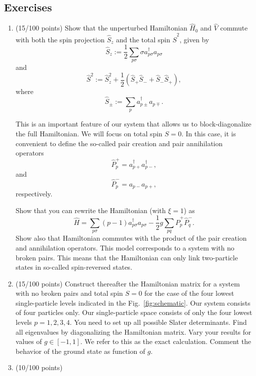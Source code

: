 \documentclass[prc]{revtex4} \usepackage[dvips]{graphicx}
\begin{document}
\subsection*{Exercises}

\begin{enumerate}
\item (15/100 points) Show that the unperturbed Hamiltonian $\hat{H}_0$ and $\hat{V}$
  commute with both the spin projection $\hat{S}_z$ and the total spin
  $\hat{S}^2$, given by
\[
  \hat{S}_z := \frac{1}{2}\sum_{p\sigma} \sigma
  a^\dag_{p\sigma}a_{p\sigma}
\]
and
\[
  \hat{S}^2 := \hat{S}_z^2 + \frac{1}{2}(\hat{S}_+\hat{S}_- +
  \hat{S}_-\hat{S}_+),
\]
where
\[
  \hat{S}_\pm := \sum_{p} a^\dag_{p\pm} a_{p\mp}.
\]

This is an important feature of our system that allows us to
block-diagonalize the full Hamiltonian. We will focus on total spin
$S=0$.  In this case, it is convenient to define the so-called pair
creation and pair annihilation operators
\[
\hat{P}^{+}_p = a^\dag_{p+}a^\dag_{p-},
\]
and
\[
\hat{P}^{-}_p = a_{p-}a_{p+},
\] 
respectively.

Show that you can rewrite the Hamiltonian (with $\xi=1$) as
\[
\hat{H}=\sum_{p\sigma}(p-1)a_{p\sigma}^{\dagger}a_{p\sigma}
-\frac{1}{2}g\sum_{pq}\hat{P}^{+}_p\hat{P}^{-}_q.
\]
Show also that Hamiltonian commutes with the product of the pair
creation and annihilation operators.  This model corresponds to a
system with no broken pairs. This means that the Hamiltonian can only
link two-particle states in so-called spin-reversed states.


\item (15/100 points) Construct thereafter the Hamiltonian matrix for a system with no
  broken pairs and total spin $S=0$ for the case of the four lowest
  single-particle levels indicated in the
  Fig.~\ref{fig:schematic}. Our system consists of four particles
  only.  Our single-particle space consists of only the four lowest
  levels $p=1,2,3,4$.  You need to set up all possible Slater
  determinants.  Find all eigenvalues by diagonalizing the Hamiltonian
  matrix.  Vary your results for values of $g\in [-1,1]$.  We refer to
  this as the exact calculation. Comment the behavior of the ground
  state as function of $g$.

\item  (10/100 points)


\end{enumerate}
\end{document}
